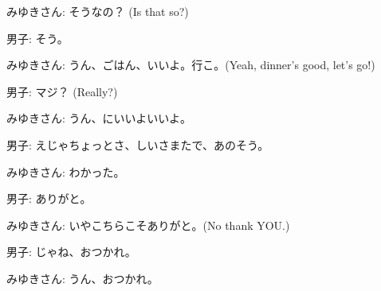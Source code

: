 \documentclass[../nihongo-gakushuu-kyouzai.tex]{subfiles}
\begin{document}
\begin{itemize}
    みゆきさん: そうなの？ (Is that so?)

    男子: そう。

    みゆきさん: うん、ごはん、いいよ。行こ。(Yeah, dinner's good, let's go!)

    男子: マジ？ (Really?)

    みゆきさん: うん、にいいよいいよ。

    男子: えじゃちょっとさ、しいさまたで、あのそう。

    みゆきさん: わかった。

    男子: ありがと。

    みゆきさん: いやこちらこそありがと。(No thank YOU.)

    男子: じゃね、おつかれ。

    みゆきさん: うん、おつかれ。
\end{itemize}
\end{document}
